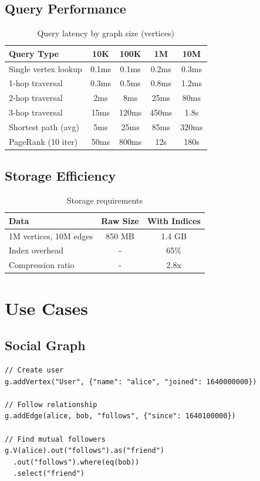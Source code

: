 \documentclass[11pt,a4paper]{article}
\theoremstyle{definition}
\begin{document}
\subsection{Query Performance}

\begin{table}[h]
\centering
\begin{tabular}{@{}lcccc@{}}
\toprule
Query Type & 10K & 100K & 1M & 10M \\
\midrule
Single vertex lookup & 0.1ms & 0.1ms & 0.2ms & 0.3ms \\
1-hop traversal & 0.3ms & 0.5ms & 0.8ms & 1.2ms \\
2-hop traversal & 2ms & 8ms & 25ms & 80ms \\
3-hop traversal & 15ms & 120ms & 450ms & 1.8s \\
Shortest path (avg) & 5ms & 25ms & 85ms & 320ms \\
PageRank (10 iter) & 50ms & 800ms & 12s & 180s \\
\bottomrule
\end{tabular}
\caption{Query latency by graph size (vertices)}
\end{table}

\subsection{Storage Efficiency}

\begin{table}[h]
\centering
\begin{tabular}{@{}lcc@{}}
\toprule
Data & Raw Size & With Indices \\
\midrule
1M vertices, 10M edges & 850 MB & 1.4 GB \\
Index overhead & - & 65\% \\
Compression ratio & - & 2.8x \\
\bottomrule
\end{tabular}
\caption{Storage requirements}
\end{table}

\section{Use Cases}

\subsection{Social Graph}

\begin{lstlisting}
// Create user
g.addVertex("User", {"name": "alice", "joined": 1640000000})

// Follow relationship
g.addEdge(alice, bob, "follows", {"since": 1640100000})

// Find mutual followers
g.V(alice).out("follows").as("friend")
  .out("follows").where(eq(bob))
  .select("friend")
\end{lstlisting}
\end{document}
